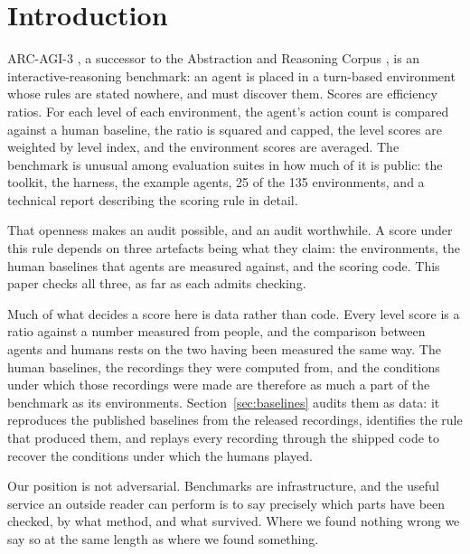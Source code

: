 \documentclass[11pt]{article}
\begin{document}
\section{Introduction}

ARC-AGI-3 \cite{arcagi3}, a successor to the Abstraction and Reasoning
Corpus \cite{chollet}, is an interactive-reasoning benchmark: an agent is
placed in a turn-based environment whose rules are stated nowhere, and must
discover them. Scores are efficiency ratios. For each level of each environment,
the agent's action count is compared against a human baseline, the ratio is
squared and capped, the level scores are weighted by level index, and the
environment scores are averaged. The benchmark is unusual among evaluation
suites in how much of it is public: the toolkit, the harness, the example
agents, 25 of the 135 environments, and a technical report describing the
scoring rule in detail.

That openness makes an audit possible, and an audit worthwhile. A score under
this rule depends on three artefacts being what they claim: the environments,
the human baselines that agents are measured against, and the scoring code. This paper
checks all three, as far as each admits checking.

Much of what decides a score here is data rather than code. Every level score
is a ratio against a number measured from people, and the comparison between
agents and humans rests on the two having been measured the same way. The
human baselines, the recordings they were computed from, and the conditions
under which those recordings were made are therefore as much a part of the
benchmark as its environments. Section~\ref{sec:baselines} audits them as data:
it reproduces the published baselines from the released recordings, identifies
the rule that produced them, and replays every recording through the shipped
code to recover the conditions under which the humans played.

Our position is not adversarial. Benchmarks are infrastructure, and the useful
service an outside reader can perform is to say precisely which parts have been
checked, by what method, and what survived. Where we found nothing wrong we say
so at the same length as where we found something.
\end{document}
